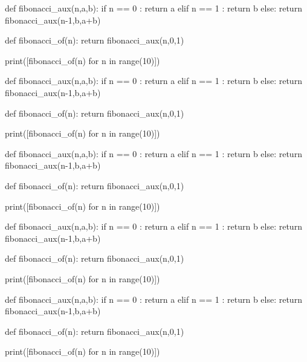 \documentclass[a4paper,11pt]{article}
\begin{document}
\begin{NotebookPitonOut}{0.75\linewidth}
def fibonacci_aux(n,a,b):
	if n == 0 :
		return a
	elif n == 1 :
		return b
	else:
		return fibonacci_aux(n-1,b,a+b)

def fibonacci_of(n):
	return fibonacci_aux(n,0,1)

print([fibonacci_of(n) for n in range(10)])
\end{NotebookPitonOut}

\pagebreak

\begin{codehigh}
\SetJupyterParSkip{\baselineskip}
\setcounter{JupyterIn}{11}
\end{codehigh}

\SetJupyterParSkip{\baselineskip}
\setcounter{JupyterIn}{11}

\begin{codehigh}
\begin{NotebookPitonIn}[center]{0.75\linewidth}
def fibonacci_aux(n,a,b):
  if n == 0 :
    return a
  elif n == 1 :
    return b
  else:
    return fibonacci_aux(n-1,b,a+b)

def fibonacci_of(n):
  return fibonacci_aux(n,0,1)

print([fibonacci_of(n) for n in range(10)])
\end{NotebookPitonIn}
\end{codehigh}

\begin{NotebookPitonIn}[center]{0.75\linewidth}
def fibonacci_aux(n,a,b):
	if n == 0 :
		return a
	elif n == 1 :
		return b
	else:
		return fibonacci_aux(n-1,b,a+b)

def fibonacci_of(n):
	return fibonacci_aux(n,0,1)

print([fibonacci_of(n) for n in range(10)])
\end{NotebookPitonIn}

\begin{codehigh}
\begin{NotebookPitonOut}[center]{0.75\linewidth}
def fibonacci_aux(n,a,b):
  if n == 0 :
    return a
  elif n == 1 :
    return b
  else:
    return fibonacci_aux(n-1,b,a+b)

def fibonacci_of(n):
  return fibonacci_aux(n,0,1)

print([fibonacci_of(n) for n in range(10)])
\end{NotebookPitonOut}
\end{codehigh}

\begin{NotebookPitonOut}[center]{0.75\linewidth}
def fibonacci_aux(n,a,b):
	if n == 0 :
		return a
	elif n == 1 :
		return b
	else:
		return fibonacci_aux(n-1,b,a+b)

def fibonacci_of(n):
	return fibonacci_aux(n,0,1)

print([fibonacci_of(n) for n in range(10)])
\end{NotebookPitonOut}
\end{document}
